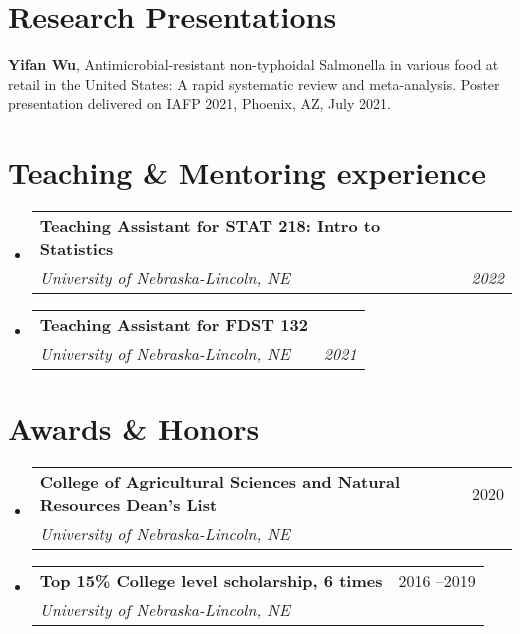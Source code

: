 \documentclass[letterpaper,11pt]{article}
\makeatletter
\newcommand{\resumeSubheading}[4]{
  \vspace{-2pt}\item
    \begin{tabular*}{0.97\textwidth}[t]{l@{\extracolsep{\fill}}r}
      \textbf{#1} & #2 \\
      \textit{\small #3} & \textit{\small #4} \\
    \end{tabular*}\vspace{-10pt}
}
\newcommand{\resumeSubHeadingListStart}{\begin{itemize}[leftmargin=0.15in, label={}]}
\newcommand{\resumeSubHeadingListEnd}{\end{itemize}}
\makeatother
\begin{document}
\section{Research Presentations} 
\begin{itemize}[leftmargin=0.15in, label={}]
    \normalsize{\item{
    {\textbf{Yifan Wu}, Antimicrobial-resistant non-typhoidal Salmonella in various food at retail in the United States: A rapid systematic review and meta-analysis. Poster presentation delivered on IAFP 2021, Phoenix, AZ, July 2021.}{} \\
}}
 \end{itemize}

\section{Teaching \& Mentoring experience} 

\resumeSubHeadingListStart
    \resumeSubheading
    {Teaching Assistant for STAT 218: Intro to Statistics}{}
    {University of Nebraska-Lincoln, NE}{2022}
    \resumeSubheading
    {Teaching Assistant for FDST 132}{}
     {University of Nebraska-Lincoln, NE}{2021}
 
\resumeSubHeadingListEnd

\section{Awards \& Honors} 
\resumeSubHeadingListStart
    \resumeSubheading
    {College of Agricultural Sciences and Natural Resources Dean’s List}{2020}
    {University of Nebraska-Lincoln, NE}{}
    \resumeSubheading
    {Top 15\% College level scholarship, 6 times}{2016 --2019}
    {University of Nebraska-Lincoln, NE}{}
   
\resumeSubHeadingListEnd

\end{document}
